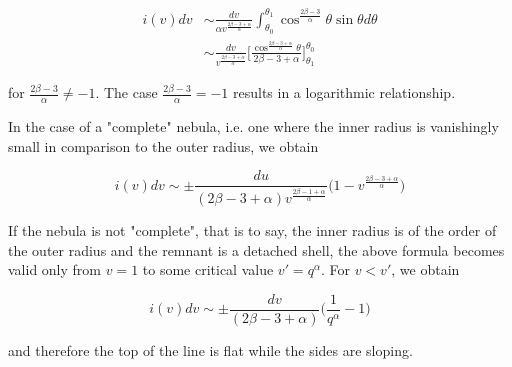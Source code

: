 \documentclass[useAMS,usenatbib,usegraphicx]{mnras}
\begin{document}
\begin{equation}
\begin{split}
i(v)dv &\sim \frac{dv}{\alpha v^{\frac{2\beta-3+\alpha}{\alpha}}} \int^{\theta_1}_{\theta_0} \cos^{\frac{2\beta-3}{\alpha}} \theta \sin \theta d\theta 
\\
&\sim  \frac{dv}{v^{\frac{2\beta-3+\alpha}{\alpha}}} \Bigg[\frac{\cos^{\frac{2\beta - 3 + \alpha}{\alpha}} \theta}{2\beta -3 + \alpha}\Bigg]^{\theta_0}_{\theta_1}
\end{split}
\end{equation}

\noindent for $\frac{2\beta-3}{\alpha} \neq -1$.  The case $\frac{2\beta-3}{\alpha} = -1$ results in a logarithmic relationship.  




In the case of a "complete" nebula, i.e. one where the inner radius is vanishingly small in comparison to the outer radius, we obtain

\begin{equation}
\label{eqn:sides}
	i(v) dv \sim \pm \frac{du}{(2\beta-3+\alpha) v^{\frac{2\beta-1+\alpha}{\alpha}}} \Big(1-v^{\frac{2\beta-3+\alpha}{\alpha}} \Big)
\end{equation}

If the nebula is not "complete", that is to say, the inner radius is of the order of the outer radius and the remnant is a detached shell, the above formula becomes valid only from $v=1$ to some critical value $v'=q^\alpha$. For $v<v'$, we obtain

\begin{equation}
i(v)dv \sim \pm \frac{dv}{(2\beta-3+\alpha)} \Big( \frac{1}{q^\alpha} - 1 \Big)
\end{equation}

\noindent and therefore the top of the line is flat while the sides are sloping. 
\end{document}
